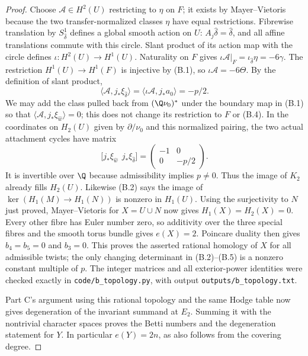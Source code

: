 \begin{proof}
Choose $\mathcal A\in H^2(U)$ restricting to $\eta$ on $F$;
it exists by Mayer--Vietoris because the two transfer-normalized
classes $\eta$ have equal restrictions. Fibrewise translation by
$S^1_{\hat\delta}$ defines a global smooth action on $U$:
$A_j\hat\delta=\hat\delta$, and all affine translations commute
with this circle. Slant product of its action map with the circle
defines $\iota:H^2(U)\to H^1(U)$. Naturality on $F$ gives
$\iota\mathcal A|_F=\iota_{\hat\delta}\eta=-6\gamma$.
The restriction $H^1(U)\to H^1(F)$ is injective by (B.1), so
$\iota\mathcal A=-6\Theta$. By the definition of slant product,
\[
 \langle\mathcal A,j_*\xi_{\hat\delta}\rangle
 =\langle\iota\mathcal A,j_*a_0\rangle=-p/2.           \tag{B.4}
\]
We may add the class pulled back from $(\Q\nu_0)^*$ under
the boundary map in (B.1) so that
$\langle\mathcal A,j_*\xi_{\hat w}\rangle=0$;
this does not change its restriction to $F$ or (B.4).
In the coordinates on $H_2(U)$ given by $\partial/\nu_0$ and
this normalized pairing, the two actual attachment cycles have
matrix
\[
 \bigl[j_*\xi_{\hat w}\ \ j_*\xi_{\hat\delta}\bigr]
 =\begin{pmatrix}-1&0\\0&-p/2\end{pmatrix}.             \tag{B.5}
\]
It is invertible over $\Q$ because admissibility implies
$p\ne0$. Thus the image of $K_2$ already fills $H_2(U)$.
Likewise (B.2) says the image of $\ker(H_1(M)\to H_1(N))$
is nonzero in $H_1(U)$. Using the surjectivity to $N$ just proved,
Mayer--Vietoris for $X=U\cup N$ now gives $H_1(X)=H_2(X)=0$.
Every other fibre has Euler number zero, so additivity over the
three special fibres and the smooth torus bundle gives $e(X)=2$.
Poincare duality then gives $b_4=b_5=0$ and $b_3=0$.
This proves the asserted rational homology of $X$ for all admissible
twists; the only changing determinant in (B.2)--(B.5) is a nonzero
constant multiple of $p$. The integer matrices and all exterior-power
identities were checked exactly in \texttt{code/b\_topology.py},
with output \texttt{outputs/b\_topology.txt}.

Part C's argument using this rational topology and the same Hodge
table now gives degeneration of the invariant summand at $E_2$.
Summing it with the nontrivial character spaces proves the Betti
numbers and the degeneration statement for $Y$. In particular
$e(Y)=2n$, as also follows from the covering degree.
\end{proof}
